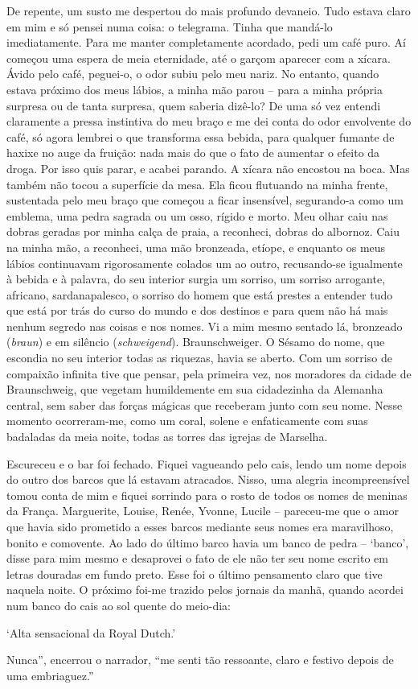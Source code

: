 De repente, um susto me despertou do mais profundo devaneio. Tudo estava
claro em mim e só pensei numa coisa: o telegrama. Tinha que mandá-lo
imediatamente. Para me manter completamente acordado, pedi um café puro.
Aí começou uma espera de meia eternidade, até o garçom aparecer com a
xícara. Ávido pelo café, peguei-o, o odor subiu pelo meu nariz. No
entanto, quando estava próximo dos meus lábios, a minha mão parou --
para a minha própria surpresa ou de tanta surpresa, quem saberia
dizê-lo? De uma só vez entendi claramente a pressa instintiva do meu
braço e me dei conta do odor envolvente do café, só agora lembrei o que
transforma essa bebida, para qualquer fumante de haxixe no auge da
fruição: nada mais do que o fato de aumentar o efeito da droga. Por isso
quis parar, e acabei parando. A xícara não encostou na boca. Mas também
não tocou a superfície da mesa. Ela ficou flutuando na minha frente,
sustentada pelo meu braço que começou a ficar insensível, segurando-a
como um emblema, uma pedra sagrada ou um osso, rígido e morto. Meu olhar
caiu nas dobras geradas por minha calça de praia, a reconheci, dobras do
albornoz. Caiu na minha mão, a reconheci, uma mão bronzeada, etíope, e
enquanto os meus lábios continuavam rigorosamente colados um ao outro,
recusando-se igualmente à bebida e à palavra, do seu interior surgia um
sorriso, um sorriso arrogante, africano, sardanapalesco, o sorriso do
homem que está prestes a entender tudo que está por trás do curso do
mundo e dos destinos e para quem não há mais nenhum segredo nas coisas e
nos nomes. Vi a mim mesmo sentado lá, bronzeado (\emph{braun}) e em
silêncio (\emph{schweigend}). Braunschweiger. O Sésamo do nome, que
escondia no seu interior todas as riquezas, havia se aberto. Com um
sorriso de compaixão infinita tive que pensar, pela primeira vez, nos
moradores da cidade de Braunschweig, que vegetam humildemente em sua
cidadezinha da Alemanha central, sem saber das forças mágicas que
receberam junto com seu nome. Nesse momento ocorreram-me, como um coral,
solene e enfaticamente com suas badaladas da meia noite, todas as torres
das igrejas de Marselha.

Escureceu e o bar foi fechado. Fiquei vagueando pelo cais, lendo um nome
depois do outro dos barcos que lá estavam atracados. Nisso, uma alegria
incompreensível tomou conta de mim e fiquei sorrindo para o rosto de
todos os nomes de meninas da França. Marguerite, Louise, Renée, Yvonne,
Lucile -- pareceu-me que o amor que havia sido prometido a esses barcos
mediante seus nomes era maravilhoso, bonito e comovente. Ao lado do
último barco havia um banco de pedra -- `banco', disse para mim mesmo e
desaprovei o fato de ele não ter seu nome escrito em letras douradas em
fundo preto. Esse foi o último pensamento claro que tive naquela noite.
O próximo foi-me trazido pelos jornais da manhã, quando acordei num
banco do cais ao sol quente do meio-dia:

`Alta sensacional da Royal Dutch.'

Nunca'', encerrou o narrador, ``me senti tão ressoante, claro e festivo
depois de uma embriaguez.''